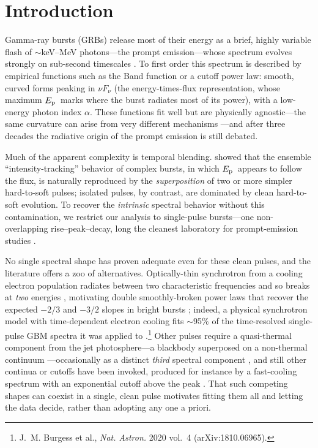 \documentclass[twocolumn]{aastex631}
\newcommand{\Ep}{\ensuremath{E_{\rm p}}}
\begin{document}
\section{Introduction} \label{sec:intro}

Gamma-ray bursts (GRBs) release most of their energy as a brief, highly variable
flash of $\sim$keV--MeV photons---the prompt emission---whose spectrum evolves
strongly on sub-second timescales \citep{Norris1996,Kaneko2006,Lu2012,Yu2016}.
To first order this spectrum is described by empirical functions such as the Band
function \citep{Band1993} or a cutoff power law: smooth, curved forms peaking in
$\nu F_\nu$ (the energy-times-flux representation, whose maximum \Ep\ marks where
the burst radiates most of its power), with a low-energy photon index $\alpha$.
These functions fit well but are physically agnostic---the same curvature can
arise from very different mechanisms \citep{KumarZhang2015}---and after three
decades the radiative origin of the prompt emission is still debated.

Much of the apparent complexity is temporal blending. \citet{HakkilaPreece2011}
showed that the ensemble ``intensity-tracking'' behavior of complex bursts, in
which \Ep\ appears to follow the flux, is naturally reproduced by the
\emph{superposition} of two or more simpler hard-to-soft pulses; isolated pulses,
by contrast, are dominated by clean hard-to-soft evolution. To recover the
\emph{intrinsic} spectral behavior without this contamination, we restrict our
analysis to single-pulse bursts---one non-overlapping rise--peak--decay, long the
cleanest laboratory for prompt-emission studies
\citep{RydePeer2009,Basak2014,Yu2016,Busby2024}.

No single spectral shape has proven adequate even for these clean pulses, and the
literature offers a zoo of alternatives. Optically-thin synchrotron from a cooling
electron population radiates between two characteristic frequencies and so breaks
at \emph{two} energies \citep{Sari1998}, motivating double smoothly-broken power
laws that recover the expected $-2/3$ and $-3/2$ slopes in bright bursts
\citep{Oganesyan2017,Oganesyan2018,Ravasio2018,Ravasio2019}; indeed, a physical
synchrotron model with time-dependent electron cooling fits $\sim$95\% of the
time-resolved single-pulse GBM spectra it was applied to
\citep{Burgess2020cool}.\footnote{J.~M. Burgess et al., \textit{Nat. Astron.} 2020 vol.~4 (arXiv:1810.06965).} Other pulses require a quasi-thermal component from the
jet photosphere---a blackbody superposed on a non-thermal continuum
\citep{Ryde2004,Guiriec2010,Guiriec2011,Burgess2014a}---occasionally as a distinct
\emph{third} spectral component \citep{Guiriec2015}, and still other continua or
cutoffs have been invoked, produced for instance by a fast-cooling spectrum with an
exponential cutoff above the peak \citep{Varun2025}. That such competing shapes can
coexist in a single, clean pulse motivates fitting them all and letting the data
decide, rather than adopting any one a priori.
\end{document}
